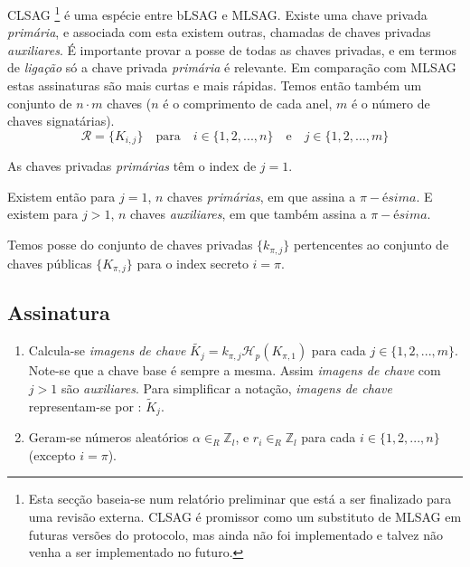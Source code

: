 \begin{description}
CLSAG \cite{MRL-0011-CLSAG}
\footnote{Esta secção baseia-se num relatório preliminar que está a ser finalizado para uma revisão externa. CLSAG é promissor como um substituto de MLSAG em futuras versões do protocolo, mas ainda não foi implementado e talvez não venha a ser implementado no futuro.}
é uma espécie entre bLSAG e MLSAG. Existe uma chave privada {\em primária}, e associada com esta existem outras, chamadas de chaves privadas {\em auxiliares}. É importante provar a posse de todas as chaves privadas, e em termos de {\em ligação} só a chave privada {\em primária} é relevante. Em comparação com MLSAG estas assinaturas são mais curtas e mais rápidas.
Temos então também um conjunto de \(n \cdot m\) chaves ($n$ é o comprimento de cada anel, $m$ é o número de chaves signatárias). 
\vspace{.175cm}
\[\mathcal{R} = \{K_{i,j}\}  \quad \textrm{para} \quad  i \in \{1, 2, ..., n\} \quad \textrm{e} \quad j \in \{1, 2, ..., m\}\]

As chaves privadas {\em primárias} têm o index de \(j = 1\). 

Existem então para \(j = 1\), $n$ chaves {\em primárias}, em que assina a $\pi-ésima$.
E existem para \(j > 1\), $n$ chaves {\em auxiliares}, em que também assina a $\pi-ésima$.  

Temos posse do conjunto de chaves privadas \(\{k_{\pi, j}\}\) pertencentes ao conjunto de chaves públicas \(\{K_{\pi, j}\}\) para o index secreto \(i = \pi\).

\subsection*{Assinatura}

\begin{enumerate}
	\item Calcula-se {\em imagens de chave} \(\tilde{K_j} = k_{\pi, j} \mathcal{H}_p(K_{\pi, 1})\) para cada \(j \in \{1, 2, ..., m\}\). Note-se que a chave base é sempre a mesma. Assim {\em imagens de chave} com $j>1$ são {\em auxiliares}. Para simplificar a notação, 
{\em imagens de chave} representam-se por : $\tilde{K}_j$.

	\item Geram-se números aleatórios \(\alpha \in_R \mathbb{Z}_l\), e \(r_{i} \in_R \mathbb{Z}_l\) para cada \(i \in \{1, 2, ..., n\}\) (excepto \(i = \pi\)).


\end{enumerate}
\end{description}
